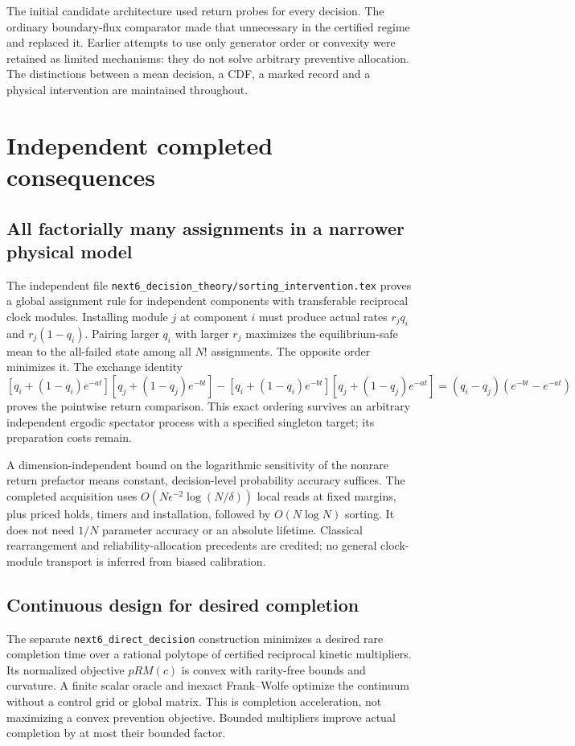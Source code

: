 The initial candidate architecture used return probes for every decision. The ordinary boundary-flux comparator made that unnecessary in the certified regime and replaced it. Earlier attempts to use only generator order or convexity were retained as limited mechanisms: they do not solve arbitrary preventive allocation. The distinctions between a mean decision, a CDF, a marked record and a physical intervention are maintained throughout.

\section{Independent completed consequences}
\subsection{All factorially many assignments in a narrower physical model}
The independent file \texttt{next6\_decision\_theory/sorting\_intervention.tex} proves a global assignment rule for independent components with transferable reciprocal clock modules. Installing module $j$ at component $i$ must produce actual rates $r_jq_i$ and $r_j(1-q_i)$. Pairing larger $q_i$ with larger $r_j$ maximizes the equilibrium-safe mean to the all-failed state among all $N!$ assignments. The opposite order minimizes it. The exchange identity
\[
 [q_i+(1-q_i)e^{-at}][q_j+(1-q_j)e^{-bt}]
 -[q_i+(1-q_i)e^{-bt}][q_j+(1-q_j)e^{-at}]
 =(q_i-q_j)(e^{-bt}-e^{-at})
\]
proves the pointwise return comparison. This exact ordering survives an arbitrary independent ergodic spectator process with a specified singleton target; its preparation costs remain.

A dimension-independent bound on the logarithmic sensitivity of the nonrare return prefactor means constant, decision-level probability accuracy suffices. The completed acquisition uses $O(N\epsilon^{-2}\log(N/\delta))$ local reads at fixed margins, plus priced holds, timers and installation, followed by $O(N\log N)$ sorting. It does not need $1/N$ parameter accuracy or an absolute lifetime. Classical rearrangement and reliability-allocation precedents are credited; no general clock-module transport is inferred from biased calibration.

\subsection{Continuous design for desired completion}
The separate \texttt{next6\_direct\_decision} construction minimizes a desired rare completion time over a rational polytope of certified reciprocal kinetic multipliers. Its normalized objective $pR M(c)$ is convex with rarity-free bounds and curvature. A finite scalar oracle and inexact Frank--Wolfe optimize the continuum without a control grid or global matrix. This is completion acceleration, not maximizing a convex prevention objective. Bounded multipliers improve actual completion by at most their bounded factor.

